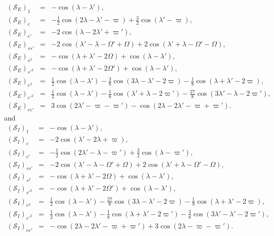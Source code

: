 \documentclass [12pt, a4paper] {article}
\begin{document}
\begin {eqnarray}
    (\mathcal{S}_E)_1 
    &=& 
    -\cos(\lambda - \lambda'),
    \\
    (\mathcal{S}_E)_e
    &=& 
    -\frac{1}{2}\cos(2\lambda - \lambda' - \varpi)
    +
    \frac{3}{2}\cos(\lambda' - \varpi),
    \\
    (\mathcal{S}_E)_{e'}
    &=&
    -2\cos(\lambda - 2\lambda' + \varpi'),
    \\
    (\mathcal{S}_E)_{ss'}
    &=&
    -2\cos(\lambda' - \lambda - \Omega' + \Omega)
    + 2\cos(\lambda' + \lambda - \Omega' - \Omega),
    \\
    (\mathcal{S}_E)_{s^2}
    &=&
    -\cos(\lambda + \lambda' - 2\Omega)
    + \cos(\lambda - \lambda'),
    \\
    (\mathcal{S}_E)_{s'^2}
    &=& 
    -\cos(\lambda + \lambda' - 2\Omega')
    + \cos(\lambda - \lambda'),
    \\
    (\mathcal{S}_E)_{e^2}
    &=&
    \frac{1}{2}\cos(\lambda - \lambda')
    -
    \frac{3}{8}\cos(3\lambda - \lambda' - 2\varpi)
    -
    \frac{1}{8}\cos(\lambda + \lambda' - 2\varpi),
    \\
    (\mathcal{S}_E)_{e'^2}
    &=& 
    \frac{1}{2}\cos(\lambda - \lambda')
    -
    \frac{1}{8}\cos(\lambda' + \lambda - 2\varpi')
    -
    \frac{27}{8}\cos(3\lambda' - \lambda - 2\varpi'),
    \\
    (\mathcal{S}_E)_{ee'}
    &=& 
    3\cos(2\lambda' - \varpi - \varpi')
    -
    \cos(2\lambda - 2\lambda' - \varpi + \varpi').
\end {eqnarray}
and
\begin {eqnarray}
    (\mathcal{S}_I)_1 
    &=& 
    -\cos(\lambda - \lambda'),
    \\
    (\mathcal{S}_I)_e
    &=&
    -2\cos(\lambda' - 2\lambda + \varpi),
    \\
    (\mathcal{S}_I)_{e'}
    &=&
    -\frac{1}{2}\cos(2\lambda' - \lambda - \varpi')
    +
    \frac{3}{2}\cos(\lambda - \varpi'),
    \\
    (\mathcal{S}_I)_{ss'}
    &=&
    -2\cos(\lambda' - \lambda - \Omega' + \Omega)
    + 2\cos(\lambda' + \lambda - \Omega' - \Omega),
    \\
    (\mathcal{S}_I)_{s^2}
    &=&
    -\cos(\lambda + \lambda' - 2\Omega)
    + \cos(\lambda - \lambda'),
    \\
    (\mathcal{S}_I)_{s'^2}
    &=&
    -\cos(\lambda + \lambda' - 2\Omega')
    + \cos(\lambda - \lambda'),
    \\
    \left(
        \mathcal{S}_I
    \right)_{e^2}
    &=& 
    \frac{1}{2}\cos(\lambda - \lambda')
    -
    \frac{27}{8}\cos(3\lambda - \lambda' - 2\varpi)
    -
    \frac{1}{8}\cos(\lambda + \lambda' - 2\varpi),
    \\
    \left(
        \mathcal{S}_I
    \right)_{e'^2}
    &=&
    \frac{1}{2}\cos(\lambda - \lambda')
    -
    \frac{1}{8}\cos(\lambda + \lambda' - 2\varpi')
    -
    \frac{3}{8}\cos(3\lambda' - \lambda' - 2\varpi'),
    \\
    \left(
        \mathcal{S}_I
    \right)_{ee'}
    &=&
    -\cos(2\lambda - 2\lambda' - \varpi + \varpi')
    +3\cos(2\lambda - \varpi - \varpi').
\end {eqnarray}
\end{document}
